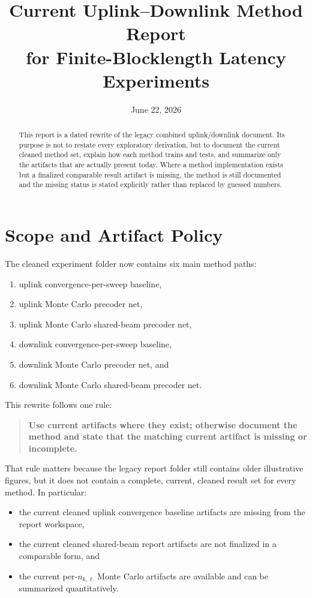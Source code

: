 \documentclass[11pt]{article}
\title{Current Uplink--Downlink Method Report\\for Finite-Blocklength Latency Experiments}
\author{}
\date{June 22, 2026}
\begin{document}
\maketitle

\begin{abstract}
This report is a dated rewrite of the legacy combined uplink/downlink document. Its purpose is not to restate every exploratory derivation, but to document the current cleaned method set, explain how each method trains and tests, and summarize only the artifacts that are actually present today. Where a method implementation exists but a finalized comparable result artifact is missing, the method is still documented and the missing status is stated explicitly rather than replaced by guessed numbers.
\end{abstract}

\section{Scope and Artifact Policy}
The cleaned experiment folder now contains six main method paths:
\begin{enumerate}[leftmargin=1.5em]
    \item uplink convergence-per-sweep baseline,
    \item uplink Monte Carlo precoder net,
    \item uplink Monte Carlo shared-beam precoder net,
    \item downlink convergence-per-sweep baseline,
    \item downlink Monte Carlo precoder net, and
    \item downlink Monte Carlo shared-beam precoder net.
\end{enumerate}

This rewrite follows one rule:
\begin{quote}
\textbf{Use current artifacts where they exist; otherwise document the method and state that the matching current artifact is missing or incomplete.}
\end{quote}

That rule matters because the legacy report folder still contains older illustrative figures, but it does not contain a complete, current, cleaned result set for every method. In particular:
\begin{itemize}[leftmargin=1.5em]
    \item the current cleaned uplink convergence baseline artifacts are missing from the report workspace,
    \item the current cleaned shared-beam report artifacts are not finalized in a comparable form, and
    \item the current per-\(n_{k,\ell}\) Monte Carlo artifacts are available and can be summarized quantitatively.
\end{itemize}
\end{document}
